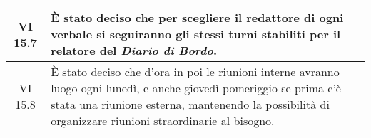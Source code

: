 \begin{table}[htbp]
\begin{tabular}{|c|p{}|}
        \hline
        VI 15.7 & È stato deciso che per scegliere il redattore di ogni verbale si seguiranno gli stessi turni stabiliti per il relatore del \emph{Diario di Bordo}. \\
        \hline
        VI 15.8 & È stato deciso che d'ora in poi le riunioni interne avranno luogo ogni lunedì, e anche giovedì pomeriggio se prima c'è stata una riunione esterna, mantenendo la possibilità di organizzare riunioni straordinarie al bisogno. \\
        \hline
    \end{tabular}
\end{table}